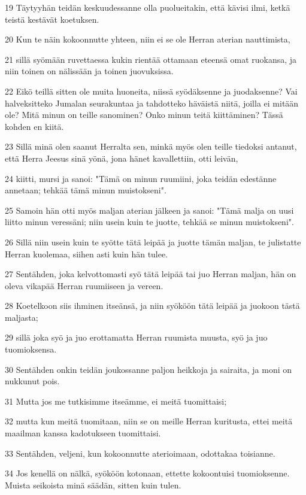 \par 19 Täytyyhän teidän keskuudessanne olla puolueitakin, että kävisi ilmi, ketkä teistä kestävät koetuksen.
\par 20 Kun te näin kokoonnutte yhteen, niin ei se ole Herran aterian nauttimista,
\par 21 sillä syömään ruvettaessa kukin rientää ottamaan eteensä omat ruokansa, ja niin toinen on nälissään ja toinen juovuksissa.
\par 22 Eikö teillä sitten ole muita huoneita, niissä syödäksenne ja juodaksenne? Vai halveksitteko Jumalan seurakuntaa ja tahdotteko häväistä niitä, joilla ei mitään ole? Mitä minun on teille sanominen? Onko minun teitä kiittäminen? Tässä kohden en kiitä.
\par 23 Sillä minä olen saanut Herralta sen, minkä myös olen teille tiedoksi antanut, että Herra Jeesus sinä yönä, jona hänet kavallettiin, otti leivän,
\par 24 kiitti, mursi ja sanoi: "Tämä on minun ruumiini, joka teidän edestänne annetaan; tehkää tämä minun muistokseni".
\par 25 Samoin hän otti myös maljan aterian jälkeen ja sanoi: "Tämä malja on uusi liitto minun veressäni; niin usein kuin te juotte, tehkää se minun muistokseni".
\par 26 Sillä niin usein kuin te syötte tätä leipää ja juotte tämän maljan, te julistatte Herran kuolemaa, siihen asti kuin hän tulee.
\par 27 Sentähden, joka kelvottomasti syö tätä leipää tai juo Herran maljan, hän on oleva vikapää Herran ruumiiseen ja vereen.
\par 28 Koetelkoon siis ihminen itseänsä, ja niin syököön tätä leipää ja juokoon tästä maljasta;
\par 29 sillä joka syö ja juo erottamatta Herran ruumista muusta, syö ja juo tuomioksensa.
\par 30 Sentähden onkin teidän joukossanne paljon heikkoja ja sairaita, ja moni on nukkunut pois.
\par 31 Mutta jos me tutkisimme itseämme, ei meitä tuomittaisi;
\par 32 mutta kun meitä tuomitaan, niin se on meille Herran kuritusta, ettei meitä maailman kanssa kadotukseen tuomittaisi.
\par 33 Sentähden, veljeni, kun kokoonnutte aterioimaan, odottakaa toisianne.
\par 34 Jos kenellä on nälkä, syököön kotonaan, ettette kokoontuisi tuomioksenne. Muista seikoista minä säädän, sitten kuin tulen.

